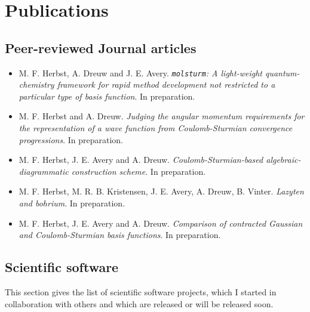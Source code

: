 \chapter*{Publications}

\section*{Peer-reviewed Journal articles}
\begin{itemize}
	\item M. F. Herbst, A. Dreuw and J. E. Avery.
		\textit{\texttt{molsturm}: A light-weight quantum-chemistry framework for rapid method development not restricted to a particular type of basis function}. In preparation.
	\item M. F. Herbst and A. Dreuw.
		\textit{Judging the angular momentum requirements for the representation of a wave function from Coulomb-Sturmian convergence progressions}. In preparation.
	\item M. F. Herbst, J. E. Avery and A. Dreuw.
		\textit{Coulomb-Sturmian-based algebraic-diagrammatic construction scheme}. In preparation.
	\item M. F. Herbst, M. R. B. Kristensen, J. E. Avery, A. Dreuw, B. Vinter.
		\textit{Lazyten and bohrium}. In preparation.
	\item M. F. Herbst, J. E. Avery and A. Dreuw.
		\textit{Comparison of contracted Gaussian and Coulomb-Sturmian basis functions}. In preparation.
\end{itemize}


\section*{Scientific software}
This section gives the list of scientific software projects,
which I started in collaboration with others
and which are released or will be released soon.

